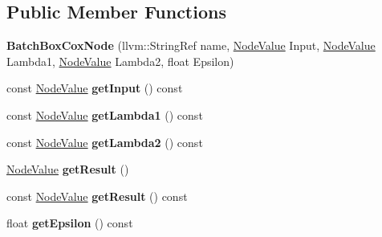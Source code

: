 \subsection*{Public Member Functions}
\begin{DoxyCompactItemize}
\item 
\mbox{\label{classglow_1_1_batch_box_cox_node_ad583e3f4e2740d999e8107901f8c4022}} 
{\bfseries Batch\+Box\+Cox\+Node} (llvm\+::\+String\+Ref name, \hyperlink{structglow_1_1_node_value}{Node\+Value} Input, \hyperlink{structglow_1_1_node_value}{Node\+Value} Lambda1, \hyperlink{structglow_1_1_node_value}{Node\+Value} Lambda2, float Epsilon)
\item 
\mbox{\label{classglow_1_1_batch_box_cox_node_a8106139f5297816380832b86adabc00a}} 
const \hyperlink{structglow_1_1_node_value}{Node\+Value} {\bfseries get\+Input} () const
\item 
\mbox{\label{classglow_1_1_batch_box_cox_node_a82b160c6927b316be43ce543bc60436f}} 
const \hyperlink{structglow_1_1_node_value}{Node\+Value} {\bfseries get\+Lambda1} () const
\item 
\mbox{\label{classglow_1_1_batch_box_cox_node_a7aa4d6765982bddfaa67790b2af006b5}} 
const \hyperlink{structglow_1_1_node_value}{Node\+Value} {\bfseries get\+Lambda2} () const
\item 
\mbox{\label{classglow_1_1_batch_box_cox_node_ab66e223af527ca64b2a0eedf53d22303}} 
\hyperlink{structglow_1_1_node_value}{Node\+Value} {\bfseries get\+Result} ()
\item 
\mbox{\label{classglow_1_1_batch_box_cox_node_a2bdc839e1f628434c7010ee66f71c909}} 
const \hyperlink{structglow_1_1_node_value}{Node\+Value} {\bfseries get\+Result} () const
\item 
\mbox{\label{classglow_1_1_batch_box_cox_node_ad3e305700373969cdfd54de2c88f73dd}} 
float {\bfseries get\+Epsilon} () const
\item 
\mbox{\label{classglow_1_1_batch_box_cox_node_a6b75e30658f5f1fa9ae93daa34140beb}} 

\end{DoxyCompactItemize}
